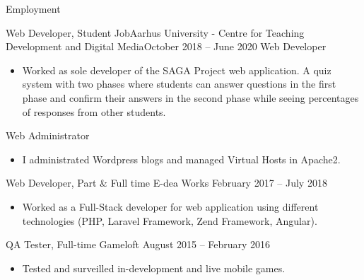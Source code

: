 \documentclass{mcdowellcv}
\begin{document}
	\makeheader
	
	\begin{cvsection}{Employment}
	
		
		\begin{cvsubsection}{Web Developer, Student Job}{Aarhus University - Centre for Teaching Development and Digital Media}{October 2018 -- June 2020}
			Web Developer	
			\begin{itemize}
				\item Worked as sole developer of the SAGA Project web application. A quiz system with two phases where students can answer questions in the first phase and confirm their answers in the second phase while seeing percentages of responses from other students.
			\end{itemize}
			Web Administrator
						\begin{itemize}
						\item I administrated Wordpress blogs and managed Virtual Hosts in Apache2.
						\end{itemize}
	
		\end{cvsubsection}
		\begin{cvsubsection}{Web Developer, Part \& Full time }{E-dea Works}{ February 2017 -- July 2018}
			\begin{itemize}
				\item Worked as a Full-Stack developer for web application using different technologies (PHP, Laravel Framework, Zend Framework, Angular).
			\end{itemize}
		
		\end{cvsubsection}
		\begin{cvsubsection}{QA Tester, Full-time }{Gameloft}{ August 2015 -- February 2016}
			\begin{itemize}
				\item Tested and surveilled in-development and live mobile games.
			\end{itemize}
		\end{cvsubsection}
	\end{cvsection}
	
\end{document}
